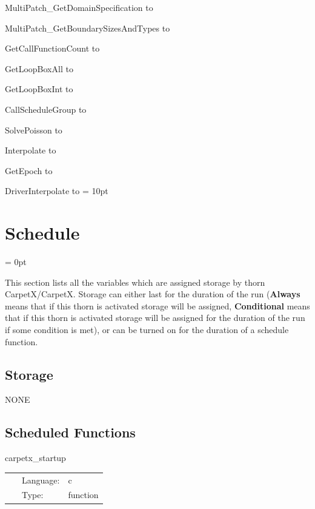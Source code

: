 MultiPatch\_GetDomainSpecification to 

MultiPatch\_GetBoundarySizesAndTypes to 

GetCallFunctionCount to 

GetLoopBoxAll to 

GetLoopBoxInt to 

CallScheduleGroup to 

SolvePoisson to 

Interpolate to 

GetEpoch to 

DriverInterpolate to 
\vspace{2mm}\parskip = 10pt 

\section{Schedule} 


\parskip = 0pt


\noindent This section lists all the variables which are assigned storage by thorn CarpetX/CarpetX.  Storage can either last for the duration of the run ({\bf Always} means that if this thorn is activated storage will be assigned, {\bf Conditional} means that if this thorn is activated storage will be assigned for the duration of the run if some condition is met), or can be turned on for the duration of a schedule function.


\subsection*{Storage}NONE
\subsection*{Scheduled Functions}
\vspace{5mm}


\hspace{5mm} carpetx\_startup 

\hspace{5mm}{\it start up the driver } 


\hspace{5mm}

 \begin{tabular*}{160mm}{cll} 
~ & Language:  & c \\ 
~ & Type:  & function \\ 
\end{tabular*} 


